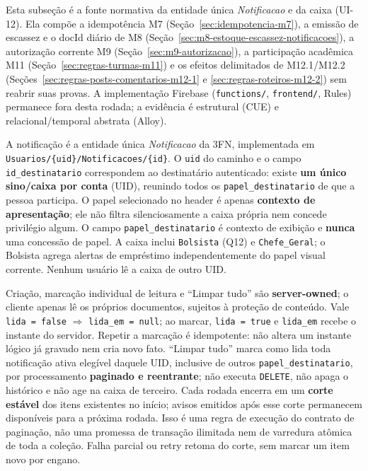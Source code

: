 Esta subseção é a fonte normativa da entidade única \textit{Notificacao} e da
caixa (UI-12). Ela compõe a idempotência M7
(Seção~\ref{sec:idempotencia-m7}), a emissão de escassez e o docId diário de M8
(Seção~\ref{sec:m8-estoque-escassez-notificacoes}), a autorização corrente M9
(Seção~\ref{sec:m9-autorizacao}), a participação acadêmica M11
(Seção~\ref{sec:regras-turmas-m11}) e os efeitos delimitados de M12.1/M12.2
(Seções~\ref{sec:regras-posts-comentarios-m12-1} e
\ref{sec:regras-roteiros-m12-2}) sem reabrir suas provas. A implementação
Firebase (\texttt{functions/}, \texttt{frontend/}, Rules) permanece fora desta
rodada; a evidência é estrutural (CUE) e relacional/temporal abstrata (Alloy).

\begin{regra}
A notificação é a entidade única \textit{Notificacao} da 3FN, implementada em
\texttt{Usuarios/\{uid\}/Notificacoes/\{id\}}. O \texttt{uid} do caminho e o
campo \texttt{id\_destinatario} correspondem ao destinatário autenticado: existe
\textbf{um único sino/caixa por conta} (UID), reunindo todos os
\texttt{papel\_destinatario} de que a pessoa participa. O papel selecionado no
header é apenas \textbf{contexto de apresentação}; ele não filtra
silenciosamente a caixa própria nem concede privilégio algum. O campo
\texttt{papel\_destinatario} é contexto de exibição e \textbf{nunca} uma
concessão de papel. A caixa inclui \texttt{Bolsista} (Q12) e
\texttt{Chefe\_Geral}; o Bolsista agrega alertas de empréstimo independentemente
do papel visual corrente. Nenhum usuário lê a caixa de outro UID.
\end{regra}

\begin{regra}
Criação, marcação individual de leitura e ``Limpar tudo'' são
\textbf{server-owned}; o cliente apenas lê os próprios documentos, sujeitos à
proteção de conteúdo. Vale \texttt{lida = false} $\Rightarrow$
\texttt{lida\_em = null}; ao marcar, \texttt{lida = true} e \texttt{lida\_em}
recebe o instante do servidor. Repetir a marcação é idempotente: não altera um
instante lógico já gravado nem cria novo fato. ``Limpar tudo'' marca como lida
toda notificação ativa elegível daquele UID, inclusive de outros
\texttt{papel\_destinatario}, por processamento \textbf{paginado e
reentrante}; não executa \texttt{DELETE}, não apaga o histórico e não age na
caixa de terceiro. Cada rodada encerra em um \textbf{corte estável} dos itens
existentes no início; avisos emitidos após esse corte permanecem disponíveis
para a próxima rodada. Isso é uma regra de execução do contrato de paginação,
não uma promessa de transação ilimitada nem de varredura atômica de toda a
coleção. Falha parcial ou retry retoma do corte, sem marcar um item novo por
engano.
\end{regra}


